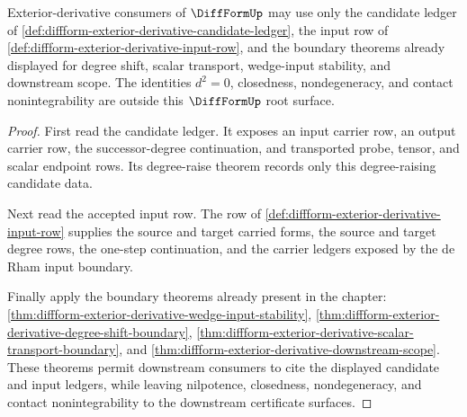 \begin{theorem}
\label{thm:diffform-root-exterior-boundary-obligation}
Exterior-derivative consumers of $\DiffFormUp$ may use only the candidate
ledger of \autoref{def:diffform-exterior-derivative-candidate-ledger}, the
input row of \autoref{def:diffform-exterior-derivative-input-row}, and the
boundary theorems already displayed for degree shift, scalar transport,
wedge-input stability, and downstream scope. The identities $d^2=0$,
closedness, nondegeneracy, and contact nonintegrability are outside this
$\DiffFormUp$ root surface.
\end{theorem}
\begin{proof}
First read the candidate ledger. It exposes an input carrier row, an output
carrier row, the successor-degree continuation, and transported probe, tensor,
and scalar endpoint rows. Its degree-raise theorem records only this
degree-raising candidate data.

Next read the accepted input row. The row of
\autoref{def:diffform-exterior-derivative-input-row} supplies the source and
target carried forms, the source and target degree rows, the one-step
continuation, and the carrier ledgers exposed by the de Rham input boundary.

Finally apply the boundary theorems already present in the chapter:
\autoref{thm:diffform-exterior-derivative-wedge-input-stability},
\autoref{thm:diffform-exterior-derivative-degree-shift-boundary},
\autoref{thm:diffform-exterior-derivative-scalar-transport-boundary}, and
\autoref{thm:diffform-exterior-derivative-downstream-scope}. These theorems
permit downstream consumers to cite the displayed candidate and input
ledgers, while leaving nilpotence, closedness, nondegeneracy, and contact
nonintegrability to the downstream certificate surfaces.
\end{proof}
